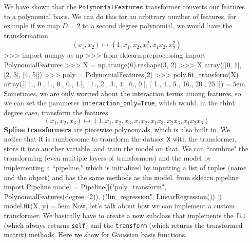 \documentclass{article}
\newenvironment{cverbatim}
 {\SaveVerbatim{cverb}}
 {\endSaveVerbatim
  \flushleft\fboxrule=0pt\fboxsep=.5em
  \colorbox{cverbbg}{%
    \makebox[\dimexpr\linewidth-2\fboxsep][l]{\BUseVerbatim{cverb}}%
  }
  \endflushleft
}
\theoremstyle{definition}
\theoremstyle{remark}
\theoremstyle{definition}
\begin{document}
We have shown that the $\texttt{PolynomialFeatures}$ transformer converts our features to a polynomial basis. We can do this for an arbitrary number of features, for example if we map $D = 2$ to a second degree polynomial, we would have the transformation 
\[(x_1, x_2) \mapsto (1, x_1, x_2, x_1^2, x_1 x_2, x_2^2)\]
\begin{cverbatim}
>>> import numpy as np
>>> from sklearn.preprocessing import PolynomialFeatures
>>> X = np.arange(6).reshape(3, 2)
>>> X
array([[0, 1],
       [2, 3],
       [4, 5]])
>>> poly = PolynomialFeatures(2)
>>> poly.fit_transform(X)
array([[ 1.,  0.,  1.,  0.,  0.,  1.],
       [ 1.,  2.,  3.,  4.,  6.,  9.],
       [ 1.,  4.,  5., 16., 20., 25.]])
\end{cverbatim}
Sometimes, we are only worried about the interaction terms among features, so we can set the parameter \texttt{interaction\_only=True}, which would, in the third degree case, transform the features 
\[(x_1, x_2, x_3) \mapsto (1, x_1, x_2, x_3, x_1 x_2, x_1 x_3, x_2 x_3, x_1 x_2 x_3)\]
\textbf{Spline transformers} are piecewise polynomials, which is also built in. We notice that it is cumbersome to transform the dataset \texttt{X} with the transformer, store it into another variable, and train the model on that. We can ``combine" the transforming (even multiple layers of transformers) and the model by implementing a ``pipeline," which is initialized by inputting a list of tuples (name and the object) and has the same methods as the model. 
\begin{cverbatim}
from sklearn.pipeline import Pipeline
model = Pipeline([("poly_transform", PolynomialFeatures(degree=2)), 
                  ("lin_regression", LinearRegression())
                  ]) 
model.fit(X, y)
\end{cverbatim}
Now, let's talk about how we can implement a custom transformer. We basically have to create a new subclass that implements the \texttt{fit} (which always returns \texttt{self}) and the \texttt{transform} (which returns the transformed matrix) methods. Here we show for Gaussian basis functions. 
\end{document}

